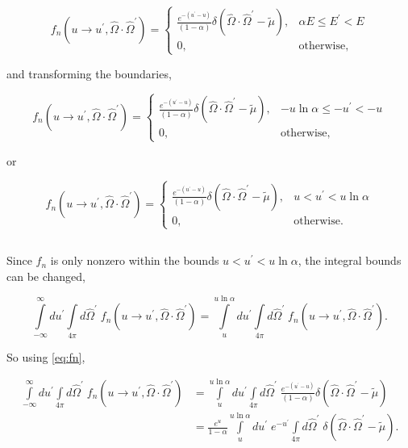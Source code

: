 \documentclass{hw-template}
\newcommand{\p}{^\prime}
\newcommand{\hOm}{\hat{\Omega}}
\begin{document}
\begin{equation}
    f_n(u \rightarrow u\p, \hOm \cdot \hOm\p) = \begin{cases}
        \frac{e^{-(u\p - u)}}{(1-\alpha)}\delta(\hOm \cdot \hOm\p - \tilde{\mu}), & \alpha E \leq E\p < E\\
        0, & \text{otherwise},
    \end{cases}
\end{equation}

and transforming the boundaries,

\begin{equation}
    f_n(u \rightarrow u\p, \hOm \cdot \hOm\p) = \begin{cases}
        \frac{e^{-(u\p - u)}}{(1-\alpha)}\delta(\hOm \cdot \hOm\p - \tilde{\mu}), & -u\ln\alpha \leq -u\p < -u\\
        0, & \text{otherwise},
    \end{cases}
\end{equation}

or

\begin{equation}\label{eq:fn}
    f_n(u \rightarrow u\p, \hOm \cdot \hOm\p) = \begin{cases}
        \frac{e^{-(u\p - u)}}{(1-\alpha)}\delta(\hOm \cdot \hOm\p - \tilde{\mu}), & u < u\p < u\ln\alpha\\
        0, & \text{otherwise}.
    \end{cases}
\end{equation}

\subsection{}

Since $f_n$ is only nonzero within the bounds $u < u\p < u\ln\alpha$, the integral bounds can be changed,

\begin{equation}
    \int\limits_{-\infty}^{\infty}du\p \int\limits_{4\pi}d\hOm\p \; f_n(u \rightarrow u\p, \hOm \cdot \hOm\p) = \int\limits_{u}^{u\ln\alpha}du\p \int\limits_{4\pi}d\hOm\p\; f_n(u \rightarrow u\p, \hOm \cdot \hOm\p).
\end{equation}

So using \autoref{eq:fn},

\begin{align}
    \int\limits_{-\infty}^{\infty}du\p \int\limits_{4\pi}d\hOm\p \; f_n(u \rightarrow u\p, \hOm \cdot \hOm\p) &= \int\limits_{u}^{u\ln\alpha}du\p \int\limits_{4\pi}d\hOm\p\; \frac{e^{-(u\p - u)}}{(1-\alpha)}\delta(\hOm \cdot \hOm\p - \tilde{\mu})\\
    &= \frac{e^u}{1-\alpha}\int\limits_{u}^{u\ln\alpha}du\p\; e^{-u\p} \int\limits_{4\pi}d\hOm\p\; \delta(\hOm \cdot \hOm\p - \tilde{\mu}).
\end{align}
\end{document}
